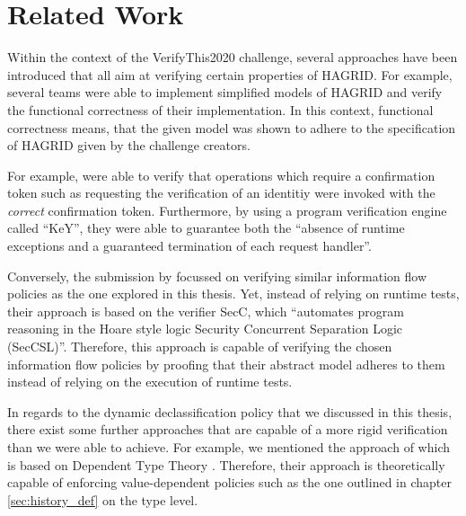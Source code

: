 
\section{Related Work}
\label{sec:related_work}

Within the context of the VerifyThis2020 challenge, several approaches have been introduced that all aim at verifying certain properties of HAGRID.
For example, several teams were able to implement simplified models of HAGRID and verify the functional correctness of their implementation. In this context, functional correctness means, that the given model was shown to adhere to the specification of HAGRID given by the challenge creators. 

For example, \citeauthor{VTLTC2020/KeY} were able to verify that operations which require a confirmation token such as requesting the verification of an identitiy were invoked with the \emph{correct} confirmation token. Furthermore, by using a program verification engine called ``KeY'', they were able to guarantee both the ``absence of runtime exceptions and a guaranteed termination of each request handler''\cite{VTLTC2020/KeY}.

Conversely, the submission by \citeauthor{VTLTC2020/IFVerify} focussed on verifying similar information flow policies as the one explored in this thesis. Yet, instead of relying on runtime tests, their approach is based on the verifier SecC, which ``automates program reasoning in the Hoare style logic Security Concurrent Separation Logic (SecCSL)''\cite{VTLTC2020/IFVerify}. Therefore, this approach is capable of verifying the chosen information flow policies by proofing that their abstract model adheres to them instead of relying on the execution of runtime tests. 

\bigskip
In regards to the dynamic declassification policy that we discussed in this thesis, there exist some further approaches that are capable of a more rigid verification than we were able to achieve. For example, we mentioned the approach of \citeauthor{Lourenco_Caires_15} which is based on Dependent Type Theory \cite{Lourenco_Caires_15}. Therefore, their approach is theoretically capable of enforcing value-dependent policies such as the one outlined in chapter \ref{sec:history_def} on the type level.
